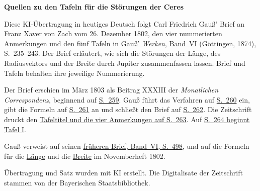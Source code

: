 \clearpage\thispagestyle{empty}
\begin{center}\textbf{Quellen zu den Tafeln für die Störungen der Ceres}\end{center}
\noindent Diese KI-Übertragung in heutiges Deutsch folgt Carl Friedrich Gauß’ Brief an Franz Xaver von Zach vom 26. Dezember 1802, den vier nummerierten Anmerkungen und den fünf Tafeln in \href{https://gdz.sub.uni-goettingen.de/id/PPN236007467}{Gauß’ \textit{Werken}, Band~VI} (Göttingen, 1874), S.~235--243. Der Brief erläutert, wie sich die Störungen der Länge, des Radiusvektors und der Breite durch Jupiter zusammenfassen lassen. Brief und Tafeln behalten ihre jeweilige Nummerierung.
\par\smallskip\noindent Der Brief erschien im März 1803 als Beitrag XXXIII der \textit{Monatlichen Correspondenz}, beginnend auf \href{https://api.digitale-sammlungen.de/iiif/image/v2/bsb10538599_00275/full/1450,/0/default.jpg}{S.~259}. Gauß führt das Verfahren auf \href{https://api.digitale-sammlungen.de/iiif/image/v2/bsb10538599_00276/full/1450,/0/default.jpg}{S.~260} ein, gibt die Formeln auf \href{https://api.digitale-sammlungen.de/iiif/image/v2/bsb10538599_00277/full/1450,/0/default.jpg}{S.~261} an und schließt den Brief auf \href{https://api.digitale-sammlungen.de/iiif/image/v2/bsb10538599_00278/full/1450,/0/default.jpg}{S.~262}. Die Zeitschrift druckt den \href{https://api.digitale-sammlungen.de/iiif/image/v2/bsb10538599_00279/full/1450,/0/default.jpg}{Tafeltitel und die vier Anmerkungen auf S.~263}. Auf \href{https://api.digitale-sammlungen.de/iiif/image/v2/bsb10538599_00280/full/1450,/0/default.jpg}{S.~264 beginnt Tafel I}.
\par\smallskip\noindent Gauß verweist auf seinen \href{https://api.digitale-sammlungen.de/iiif/image/v2/bsb10538598_00512/full/1450,/0/default.jpg}{früheren Brief, Band~VI, S.~498}, und auf die Formeln für die \href{https://api.digitale-sammlungen.de/iiif/image/v2/bsb10538598_00509/full/1450,/0/default.jpg}{Länge} und die \href{https://api.digitale-sammlungen.de/iiif/image/v2/bsb10538598_00510/full/1450,/0/default.jpg}{Breite} im Novemberheft 1802.
\par\smallskip\noindent Übertragung und Satz wurden mit KI erstellt. Die Digitalisate der Zeitschrift stammen von der Bayerischen Staatsbibliothek.
\clearpage
